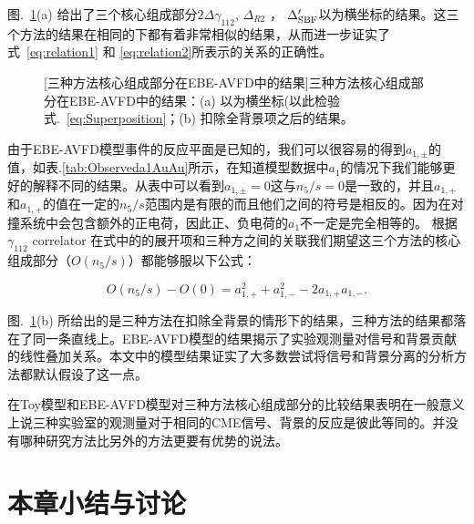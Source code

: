 图.~\ref{fig:AVFD_delta}(a) 给出了三个核心组成部分$2\Delta\gamma_{112}$, $\Delta_{R2}$ ， $\Delta'_{\rm SBF}$以\ns 为横坐标的结果。这三个方法的结果在相同的\ns 下都有着非常相似的结果，从而进一步证实了式~\ref{eq:relation1} 和 \ref{eq:relation2}所表示的关系的正确性。
\begin{figure}[htbp]
\vspace*{-0.01in}
\centering
{}
[三种方法核心组成部分在EBE-AVFD中的结果]{三种方法核心组成部分在EBE-AVFD中的结果：(a) 以\ns 为横坐标(以此检验式.~\ref{eq:Superposition}；(b) 扣除全背景项之后的结果。} \label{fig:AVFD_delta}
\end{figure}
由于EBE-AVFD模型事件的反应平面是已知的，我们可以很容易的得到$a_{1,\pm}$的值，如表.\ref{tab:Observeda1AuAu}所示，在知道模型数据中$a_1$的情况下我们能够更好的解释不同\ns 的结果。从表中可以看到$a_{1,\pm} = 0$这与$n_{5}/s=0$是一致的，并且$a_{1,+}$和$a_{1,+}$的值在一定的$n_{5}/s$范围内是有限的而且他们之间的符号是相反的。因为在对撞系统中会包含额外的正电荷，因此正、负电荷的$a_{1}$不一定是完全相等的。
根据$\gamma_{112}$ correlator 在式中的的展开项和三种方之间的关联我们期望这三个方法的核心组成部分（$O(n_{5}/s)$）都能够服以下公式：
\begin{center}
\begin{equation}
O(n_{5}/s) - O(0) =  a_{1,+}^2 + a_{1,-}^2 - 2a_{1,+}a_{1,-}.
\label{eq:Superposition}
\end{equation}
\end{center}
图.~\ref{fig:AVFD_delta}(b) 所给出的是三种方法在扣除全背景的情形下的结果，三种方法的结果都落在了同一条直线上。EBE-AVFD模型的结果揭示了实验观测量对信号和背景贡献的线性叠加关系。本文中的模型结果证实了大多数尝试将信号和背景分离的分析方法都默认假设了这一点。

在Toy模型和EBE-AVFD模型对三种方法核心组成部分的比较结果表明在一般意义上说三种实验室的观测量对于相同的CME信号、背景的反应是彼此等同的。并没有哪种研究方法比另外的方法更要有优势的说法。




\section{本章小结与讨论}


